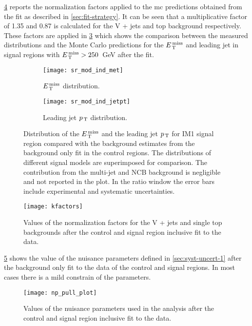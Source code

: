 \cref{fig:kfactors} reports the normalization factors applied to the \gls{mc}
predictions obtained from the fit as described in \cref{sec:fit-strategy}. It
can be seen that a multiplicative factor of 1.35 and 0.87 is calculated for the
V + jets and top background respectively. These factors are applied in
\cref{fig:sr_plots_2016} which shows the comparison between the measured
distributions and the Monte Carlo predictions for the $E_\mathrm{\, T}^\mathrm{\, miss}$ and leading jet in
signal regions with $E_\mathrm{\, T}^\mathrm{\, miss} > 250$~GeV after the fit.
\begin{figure}[!h]
  \centering
  \begin{subfigure}[t]{.48\linewidth}
    \texttt{[image: sr\_mod\_ind\_met]}
    \caption{$E_\mathrm{\, T}^\mathrm{\, miss}$ distribution.}
    \label{fig:sr_et_miss_2016}
  \end{subfigure}
  \begin{subfigure}[t]{.48\linewidth}
    \texttt{[image: sr\_mod\_ind\_jetpt]}
    \caption{Leading jet $p_\mathrm{\, T}$ distribution.}
    \label{fig:sr_jet1_pt_2016}
  \end{subfigure}
  \caption{Distribution of the $E_\mathrm{\, T}^\mathrm{\, miss}$ and the leading jet $p_\mathrm{\, T}$ for IM1 signal
    region compared with the background estimates from the background only fit
    in the control regions. The distributions of different signal models are
    superimposed for comparison. The contribution from the multi-jet and NCB
    background is negligible and not reported in the plot. In the ratio window
    the error bars include experimental and systematic uncertainties.}
  \label{fig:sr_plots_2016}
\end{figure}
\begin{figure}[!h]
  \centering
  \texttt{[image: kfactors]}
  \caption{Values of the normalization factors for the V + jets and single top
    backgrounds after the control and signal region inclusive fit to the data.}
  \label{fig:kfactors}
\end{figure}
\cref{fig:np_pull} shows the value of the nuisance parameters defined in
\cref{sec:syst-uncert-1} after the background only fit to the data of the
control and signal regions. In most cases there is a mild constrain of the
parameters.
\begin{figure}[!h]
  \centering
  \texttt{[image: np\_pull\_plot]}
  \caption{Values of the nuisance parameters used in the analysis after the
    control and signal region inclusive fit to the data.}
  \label{fig:np_pull}
\end{figure}
